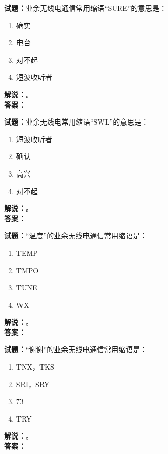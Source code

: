 \documentclass{ctexbook}
\begin{document}
\vspace{\baselineskip}

\noindent\textbf{试题：}业余无线电通信常用缩语“SURE”的意思是：
\begin{enumerate}[leftmargin=3em]
  \item 确实
  \item 电台
  \item 对不起
  \item 短波收听者
\end{enumerate}
\noindent\textbf{解说：}\textbf{}。\\\noindent\textbf{答案：}

\vspace{\baselineskip}

\noindent\textbf{试题：}业余无线电常用缩语“SWL”的意思是：
\begin{enumerate}[leftmargin=3em]
  \item 短波收听者
  \item 确认
  \item 高兴
  \item 对不起
\end{enumerate}
\noindent\textbf{解说：}\textbf{}。\\\noindent\textbf{答案：}

\vspace{\baselineskip}

\noindent\textbf{试题：}“温度”的业余无线电通信常用缩语是：
\begin{enumerate}[leftmargin=3em]
  \item TEMP
  \item TMPO
  \item TUNE
  \item WX
\end{enumerate}
\noindent\textbf{解说：}\textbf{}。\\\noindent\textbf{答案：}

\vspace{\baselineskip}

\noindent\textbf{试题：}“谢谢”的业余无线电通信常用缩语是：
\begin{enumerate}[leftmargin=3em]
  \item TNX，TKS
  \item SRI，SRY
  \item 73
  \item TRY
\end{enumerate}
\noindent\textbf{解说：}\textbf{}。\\\noindent\textbf{答案：}
\end{document}
